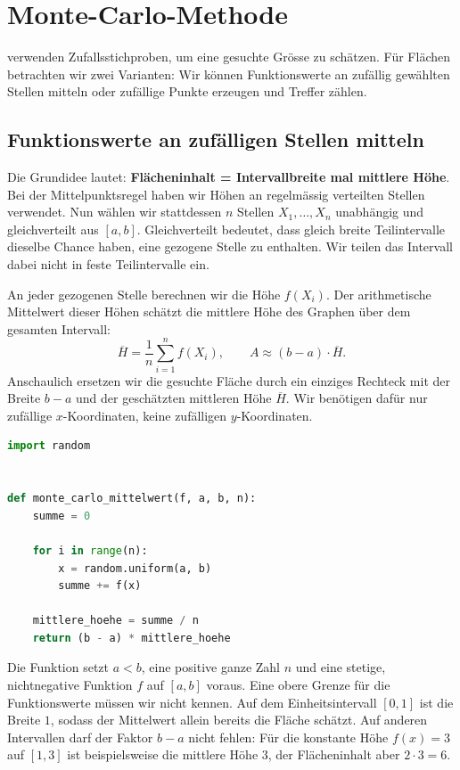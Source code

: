 \section{Monte-Carlo-Methode}

 verwenden Zufallsstichproben, um eine gesuchte Grösse zu schätzen. Für Flächen betrachten wir zwei Varianten: Wir können Funktionswerte an zufällig gewählten Stellen mitteln oder zufällige Punkte erzeugen und Treffer zählen.

\subsection{Funktionswerte an zufälligen Stellen mitteln}

Die Grundidee lautet: \textbf{Flächeninhalt = Intervallbreite mal mittlere Höhe}. Bei der Mittelpunktsregel haben wir Höhen an regelmässig verteilten Stellen verwendet. Nun wählen wir stattdessen $n$ Stellen $X_1,\ldots,X_n$ unabhängig und gleichverteilt aus $[a,b]$. Gleichverteilt bedeutet, dass gleich breite Teilintervalle dieselbe Chance haben, eine gezogene Stelle zu enthalten. Wir teilen das Intervall dabei nicht in feste Teilintervalle ein.

An jeder gezogenen Stelle berechnen wir die Höhe $f(X_i)$. Der arithmetische Mittelwert dieser Höhen schätzt die mittlere Höhe des Graphen über dem gesamten Intervall:
\[
    \overline{H}=\frac{1}{n}\sum_{i=1}^{n}f(X_i),
    \qquad A\approx (b-a)\cdot\overline{H}.
\]
Anschaulich ersetzen wir die gesuchte Fläche durch ein einziges Rechteck mit der Breite $b-a$ und der geschätzten mittleren Höhe $\overline{H}$. Wir benötigen dafür nur zufällige $x$-Koordinaten, keine zufälligen $y$-Koordinaten.

\begin{lstlisting}[language=Python, caption={Monte Carlo durch Mittelung zufälliger Höhen}, label={lst:quadratur-monte-carlo-mittelwert}]
import random


def monte_carlo_mittelwert(f, a, b, n):
    summe = 0

    for i in range(n):
        x = random.uniform(a, b)
        summe += f(x)

    mittlere_hoehe = summe / n
    return (b - a) * mittlere_hoehe
\end{lstlisting}

Die Funktion setzt $a<b$, eine positive ganze Zahl $n$ und eine stetige, nichtnegative Funktion $f$ auf $[a,b]$ voraus. Eine obere Grenze für die Funktionswerte müssen wir nicht kennen. Auf dem Einheitsintervall $[0,1]$ ist die Breite $1$, sodass der Mittelwert allein bereits die Fläche schätzt. Auf anderen Intervallen darf der Faktor $b-a$ nicht fehlen: Für die konstante Höhe $f(x)=3$ auf $[1,3]$ ist beispielsweise die mittlere Höhe $3$, der Flächeninhalt aber $2\cdot 3=6$.

